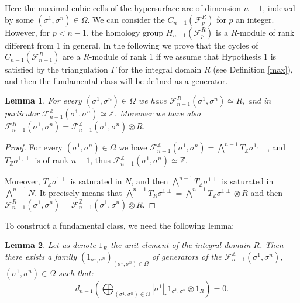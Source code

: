 \documentclass{article}
\newtheorem{lemma}{Lemma}
\begin{document}
Here the maximal cubic cells of the hypersurface are of dimension $n-1$, indexed by some $(\sigma^1,\sigma^n) \in \Omega$. We can consider the $C_{n-1}(\mathcal{F}_p^{R})$ for $p$ an integer. However, for $p<n-1$, the homology group $H_{n-1}(\mathcal{F}_p^{R})$ is a $R$-module of rank different from $1$ in general. In the following we prove that the cycles of $C_{n-1}(\mathcal{F}_{n-1}^{R})$ are a $R$-module of rank $1$ if we assume that Hypothesis $1$ is satisfied by the triangulation $\Gamma$ for the integral domain $R$ (see Definition \ref{max}), and then the fundamental class will be defined as a generator.

\begin{lemma}
    For every $(\sigma^1,\sigma^n) \in \Omega$ we have $\mathcal{F}_{n-1}^{R}(\sigma^1,\sigma^n) \simeq R$, and in particular $\mathcal{F}_{n-1}^{\mathbb{Z}}(\sigma^1,\sigma^n) \simeq \mathbb{Z}$. Moreover we have also $\mathcal{F}_{n-1}^{R}(\sigma^1,\sigma^n) = \mathcal{F}_{n-1}^{\mathbb{Z}}(\sigma^1,\sigma^n) \otimes R$.
\end{lemma}

\begin{proof}
    For every $(\sigma^1,\sigma^n) \in \Omega$ we have $\mathcal{F}_{n-1}^{\mathbb{Z}}(\sigma^1,\sigma^n) = \bigwedge^{n-1} T_{\mathbb{Z}} \sigma^{1,\perp}$, and $T_{\mathbb{Z}} \sigma^{1,\perp}$ is of rank $n-1$, thus $\mathcal{F}_{n-1}^{\mathbb{Z}}(\sigma^1,\sigma^n) \simeq \mathbb{Z}$.

    Moreover, $T_{\mathbb{Z}}\sigma^{1\perp}$ is saturated in $N$, and then $ \bigwedge^{n-1}T_{\mathbb{Z}}\sigma^{1\perp}$ is saturated in $ \bigwedge^{n-1}N$. It precisely means that  $ \bigwedge^{n-1}T_{R}\sigma^{1\perp} =  \bigwedge^{n-1}T_{\mathbb{Z}}\sigma^{1\perp} \otimes R$ and then $\mathcal{F}_{n-1}^R(\sigma^1,\sigma^n) = \mathcal{F}_{n-1}^{\mathbb{Z}}(\sigma^1,\sigma^n) \otimes R$.
\end{proof}

To construct a fundamental class, we need the following lemma:

\begin{lemma}
   Let us denote $1_R$ the unit element of the integral domain  $R$. Then there exists a family $(1_{\sigma^1,\sigma^n})_{(\sigma^1,\sigma^n) \in \Omega}$ of generators of the $\mathcal{F}_{n-1}^{\mathbb{Z}}(\sigma^1,\sigma^n)$, $ (\sigma^1,\sigma^n) \in \Omega$ such that:
    \begin{equation*}
        d_{n-1} \left ( \bigoplus_{(\sigma^1,\sigma^n) \in \Omega} |\sigma^1|_r 1_{\sigma^1,\sigma^n} \otimes 1_R \right ) = 0.
    \end{equation*}
    \label{yt}
\end{lemma}
\end{document}
